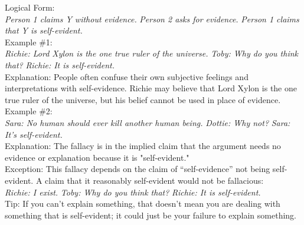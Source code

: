 \documentclass[a4paper,12pt,single,pdftex]{scrartcl}
\begin{document}
    
      Logical Form:
    \\

    
      {\em Person 1 claims Y without evidence.} \newline
{\em Person 2 asks for evidence.} \newline
{\em Person 1 claims that Y is self-evident.}
    \\

    
      Example \#1:
    \\

    
      {\em Richie: Lord Xylon is the one true ruler of the universe.} \newline
{\em Toby: Why do you think that?} \newline
{\em Richie: It is self-evident.}
    \\

    
      Explanation: People often confuse their own subjective feelings and interpretations with self-evidence. Richie may believe that Lord Xylon is the one true ruler of the universe, but his belief cannot be used in place of evidence.
    \\

    
      Example \#2:
    \\

    
      {\em Sara: No human should ever kill another human being.} \newline
{\em Dottie: Why not?} \newline
{\em Sara: It's self-evident.}
    \\

    
      Explanation: The fallacy is in the implied claim that the argument needs no evidence or explanation because it is "self-evident."
    \\

    
      Exception: This fallacy depends on the claim of “self-evidence” not being self-evident. A claim that it reasonably self-evident would not be fallacious:
    \\

    
      {\em Richie: I exist.} \newline
{\em Toby: Why do you think that?} \newline
{\em Richie: It is self-evident.}
    \\

    
      Tip: If you can't explain something, that doesn't mean you are dealing with something that is self-evident; it could just be your failure to explain something.
    \\
\end{document}
